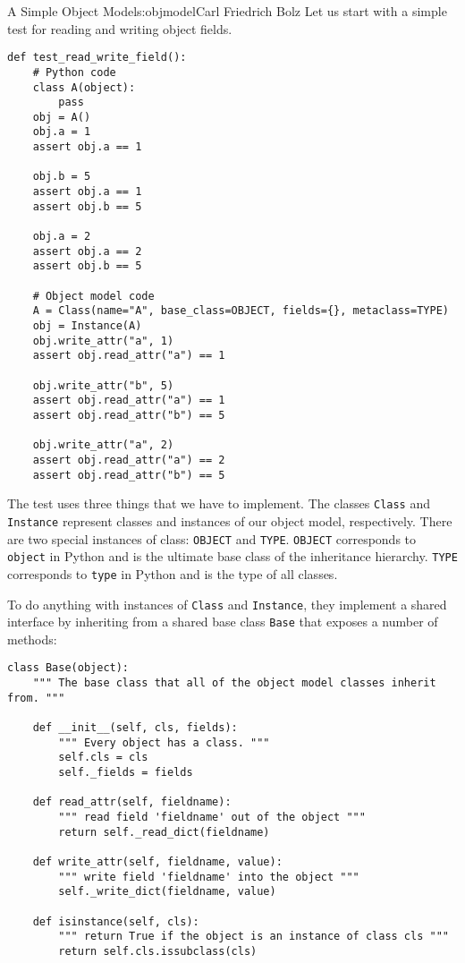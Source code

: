 \begin{aosachapter}{A Simple Object Model}{s:objmodel}{Carl Friedrich Bolz}
Let us start with a simple test for reading and writing object fields.

\begin{verbatim}
def test_read_write_field():
    # Python code
    class A(object):
        pass
    obj = A()
    obj.a = 1
    assert obj.a == 1

    obj.b = 5
    assert obj.a == 1
    assert obj.b == 5

    obj.a = 2
    assert obj.a == 2
    assert obj.b == 5

    # Object model code
    A = Class(name="A", base_class=OBJECT, fields={}, metaclass=TYPE)
    obj = Instance(A)
    obj.write_attr("a", 1)
    assert obj.read_attr("a") == 1

    obj.write_attr("b", 5)
    assert obj.read_attr("a") == 1
    assert obj.read_attr("b") == 5

    obj.write_attr("a", 2)
    assert obj.read_attr("a") == 2
    assert obj.read_attr("b") == 5
\end{verbatim}

The test uses three things that we have to implement. The classes
\texttt{Class} and \texttt{Instance} represent classes and instances of
our object model, respectively. There are two special instances of
class: \texttt{OBJECT} and \texttt{TYPE}. \texttt{OBJECT} corresponds to
\texttt{object} in Python and is the ultimate base class of the
inheritance hierarchy. \texttt{TYPE} corresponds to \texttt{type} in
Python and is the type of all classes.

To do anything with instances of \texttt{Class} and \texttt{Instance},
they implement a shared interface by inheriting from a shared base class
\texttt{Base} that exposes a number of methods:

\begin{verbatim}
class Base(object):
    """ The base class that all of the object model classes inherit from. """

    def __init__(self, cls, fields):
        """ Every object has a class. """
        self.cls = cls
        self._fields = fields

    def read_attr(self, fieldname):
        """ read field 'fieldname' out of the object """
        return self._read_dict(fieldname)

    def write_attr(self, fieldname, value):
        """ write field 'fieldname' into the object """
        self._write_dict(fieldname, value)

    def isinstance(self, cls):
        """ return True if the object is an instance of class cls """
        return self.cls.issubclass(cls)


\end{verbatim}
\end{aosachapter}
